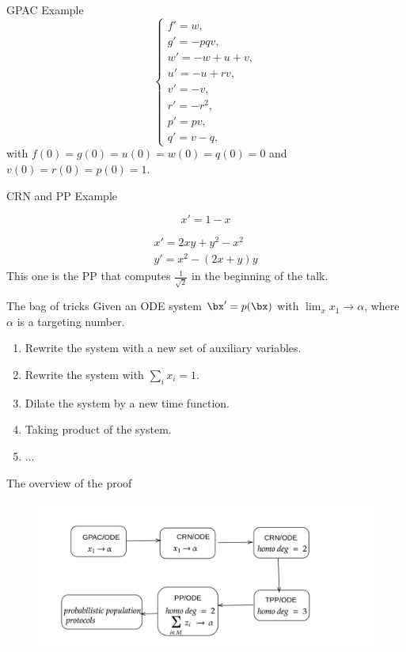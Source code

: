 \documentclass[aspectratio=169]{beamer}
\begin{document}
\begin{frame}{GPAC Example}
    \[
 \begin{cases}
    f'=w, \\
    g'=-pqv,\\
    w'=-w + u + v,\\
    u'=-u+rv,\\
    v'=-v, \\
    r'=-r^{2},\\
    p'=pv,\\
    q'=v-q,
\end{cases}
\]
with $f(0)=g(0)=u(0)=w(0)=q(0)=0$ and $v(0)=r(0)=p(0)=1$.
\end{frame}

\begin{frame}[Clean]{CRN and PP Example}
\begin{example}
\[
    x'= 1- x
\]
\end{example}
\begin{example}[PP/ODE]
    \begin{gather*}
            x' = 2xy + y^2 - x^2 \\
            y' = x^2 - (2x +y)y
   \end{gather*}
   This one is the PP that computes $\frac{1}{\sqrt{2}}$ in the beginning of the talk.
\end{example}
\end{frame}

\begin{frame}{The bag of tricks}
Given an ODE system $\bx'= p(\bx)$ with $\lim_{x}x_1 \to \alpha $, where $\alpha$ is a targeting number.
    \begin{enumerate}
        \item Rewrite the system with a new set of auxiliary variables.
        \item Rewrite the system with $\sum_i x_i = 1$.
        \item Dilate the system by a new time function.
        \item Taking product of the system.
        \item  ...
    \end{enumerate}
\end{frame}
\begin{frame}{The overview of the proof}
    \begin{figure}[tb]
        \centering
        \includegraphics[scale=0.25]{flow-chart}
    \end{figure}
\end{frame}
\end{document}
